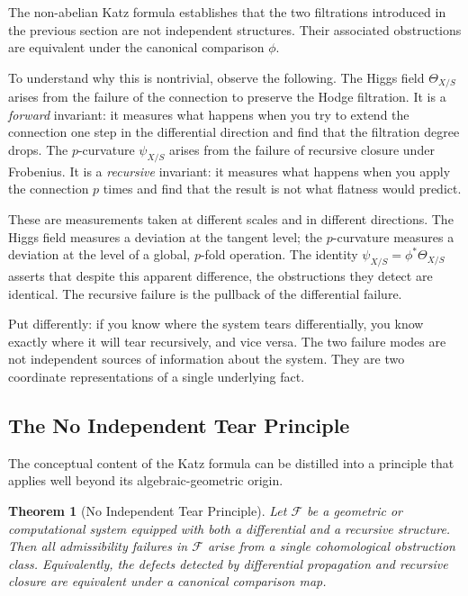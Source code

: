 \documentclass[12pt]{article}
\newtheorem{theorem}{Theorem}
\begin{document}
The non-abelian Katz formula establishes that the two filtrations introduced in the
previous section are not independent structures. Their associated obstructions are
equivalent under the canonical comparison $\phi$.

To understand why this is nontrivial, observe the following. The Higgs field
$\Theta_{X/S}$ arises from the failure of the connection to preserve the Hodge
filtration. It is a \emph{forward} invariant: it measures what happens when you try to
extend the connection one step in the differential direction and find that the
filtration degree drops. The $p$-curvature $\psi_{X/S}$ arises from the failure of
recursive closure under Frobenius. It is a \emph{recursive} invariant: it measures
what happens when you apply the connection $p$ times and find that the result is not
what flatness would predict.

These are measurements taken at different scales and in different directions. The Higgs
field measures a deviation at the tangent level; the $p$-curvature measures a deviation
at the level of a global, $p$-fold operation. The identity $\psi_{X/S} = \phi^*\Theta_{X/S}$
asserts that despite this apparent difference, the obstructions they detect are
identical. The recursive failure is the pullback of the differential failure.

Put differently: if you know where the system tears differentially, you know exactly
where it will tear recursively, and vice versa. The two failure modes are not
independent sources of information about the system. They are two coordinate
representations of a single underlying fact.

\subsection{The No Independent Tear Principle}

The conceptual content of the Katz formula can be distilled into a principle that
applies well beyond its algebraic-geometric origin.

\begin{theorem}[No Independent Tear Principle]
Let $\mathcal{F}$ be a geometric or computational system equipped with both a
differential and a recursive structure. Then all admissibility failures in
$\mathcal{F}$ arise from a single cohomological obstruction class. Equivalently, the
defects detected by differential propagation and recursive closure are equivalent under
a canonical comparison map.
\end{theorem}
\end{document}
